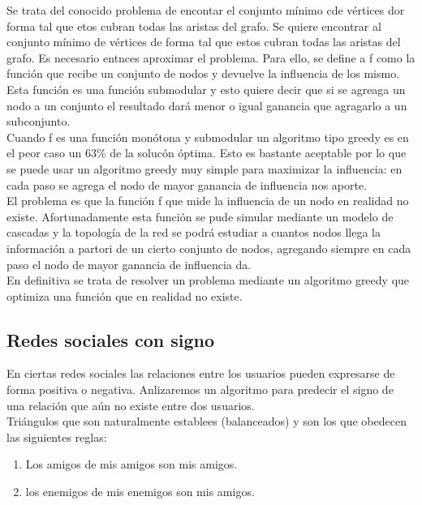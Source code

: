 \documentclass[titlepage,a4paper]{article}
\begin{document}
Se trata del conocido problema de encontar el conjunto mínimo cde vértices dor forma tal que etos cubran todas las aristas del grafo. Se quiere encontrar al conjunto mínimo de vértices de forma tal que estos cubran todas las aristas del grafo. Es necesario entnces aproximar el problema. Para ello, se define a f como la función que recibe un conjunto de nodos y devuelve la influencia de los mismo. Esta función es una función submodular y esto quiere decir que si se agreaga un nodo a un conjunto el resultado dará menor o igual ganancia que agragarlo a un subconjunto. \\

Cuando f es una función monótona y submodular un algoritmo tipo greedy es en el peor caso un  63\% de la solucón óptima. Esto es bastante aceptable por lo que se puede usar un algoritmo greedy muy simple para maximizar la influencia: en cada paso se agrega el nodo de mayor ganancia de influencia nos aporte. \\

El problema es que la función f que mide la influencia de un nodo en realidad no existe. Afortunadamente esta función se pude simular mediante un modelo de cascadas y la topología de la red se podrá estudiar a cuantos nodos llega la información a partori de un cierto conjunto de nodos, agregando siempre en cada paso el nodo de mayor ganancia de influencia da. \\

En definitiva se trata de resolver un problema mediante un algoritmo greedy que optimiza una función que en realidad no existe. \\

\subsection*{Redes sociales con signo}
En ciertas redes sociales las relaciones entre los usuarios pueden expresarse de forma positiva o negativa. Anlizaremos un algoritmo para predecir el signo de una relación que aún no existe entre dos usuarios. \\

Triángulos que son naturalmente establees (balanceados) y son los que obedecen las siguientes reglas: 
\begin{enumerate}
\item Los amigos de mis amigos son mis amigos. 
\item los enemigos de mis enemigos son mis amigos. 
\end{enumerate}
\end{document}
